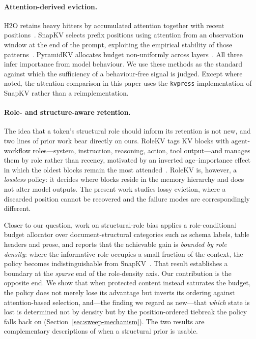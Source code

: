 \paragraph{Attention-derived eviction.}
H2O retains heavy hitters by accumulated attention together with recent
positions~\cite{zhang2023h2o}.  SnapKV selects prefix positions using attention
from an observation window at the end of the prompt, exploiting the empirical
stability of those patterns~\cite{li2024snapkv}.  PyramidKV allocates budget
non-uniformly across layers~\cite{cai2024pyramidkv}.  All three infer importance
from model behaviour.  We use these methods as the standard against which the
sufficiency of a behaviour-free signal is judged.  Except where noted, the
attention comparison in this paper uses the \texttt{kvpress} implementation of
SnapKV rather than a reimplementation.

\paragraph{Role- and structure-aware retention.}
The idea that a token's structural role should inform its retention is not new,
and two lines of prior work bear directly on ours.  RoleKV tags KV blocks with
agent-workflow roles---system, instruction, reasoning, action, tool
output---and manages them by role rather than recency, motivated by an inverted
age--importance effect in which the oldest blocks remain the most
attended~\cite{rolekv}.  RoleKV is, however, a \emph{lossless} policy: it
decides where blocks reside in the memory hierarchy and does not alter model
outputs.  The present work studies lossy eviction, where a discarded position
cannot be recovered and the failure modes are correspondingly different.

Closer to our question, work on structural-role bias applies a role-conditional
budget allocator over document-structural categories such as schema labels,
table headers and prose, and reports that the achievable gain is \emph{bounded
by role density}: where the informative role occupies a small fraction of the
context, the policy becomes indistinguishable from
SnapKV~\cite{structrolebias}.  That result establishes a boundary at the
\emph{sparse} end of the role-density axis.  Our contribution is the opposite
end.  We show that when protected content instead saturates the budget, the
policy does not merely lose its advantage but inverts its ordering against
attention-based selection, and---the finding we regard as
new---that \emph{which} state is lost is determined not by density but by the
position-ordered tiebreak the policy falls back on
(Section~\ref{sec:sweep-mechanism}).  The two results are complementary
descriptions of when a structural prior is usable.

